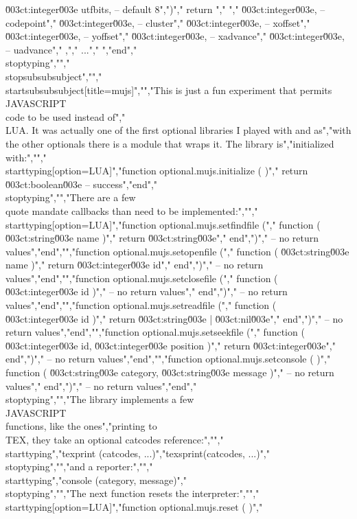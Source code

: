 \u003ct:integer\u003e  utfbits, -- default 8",")","    return {","        {","            \u003ct:integer\u003e, -- codepoint","            \u003ct:integer\u003e, -- cluster","            \u003ct:integer\u003e, -- xoffset","            \u003ct:integer\u003e, -- yoffset","            \u003ct:integer\u003e, -- xadvance","            \u003ct:integer\u003e, -- uadvance","        },","        ...","    }","end","\\stoptyping","","\\stopsubsubsubject","","\\startsubsubsubject[title=mujs]","","This is just a fun experiment that permits \\JAVASCRIPT\\ code to be used instead of","\\LUA. It was actually one of the first optional libraries I played with and as","with the other optionals there is a module that wraps it. The library is","initialized with:","","\\starttyping[option=LUA]","function optional.mujs.initialize ( )","    return \u003ct:boolean\u003e -- success","end","\\stoptyping","","There are a few \\quote {mandate} callbacks than need to be implemented:","","\\starttyping[option=LUA]","function optional.mujs.setfindfile (","    function ( \u003ct:string\u003e name )","        return \u003ct:string\u003e","    end",")","    -- no return values","end","","function optional.mujs.setopenfile  (","    function ( \u003ct:string\u003e name )","        return \u003ct:integer\u003e id","    end",")","    -- no return values","end","","function optional.mujs.setclosefile (","    function ( \u003ct:integer\u003e id )","        -- no return values","    end",")","    -- no return values","end","","function optional.mujs.setreadfile (","    function ( \u003ct:integer\u003e id )","        return \u003ct:string\u003e | \u003ct:nil\u003e","    end",")","    -- no return values","end","","function optional.mujs.setseekfile (","    function ( \u003ct:integer\u003e id, \u003ct:integer\u003e position )","        return \u003ct:integer\u003e","    end",")","    -- no return values","end","","function optional.mujs.setconsole ( )","    function ( \u003ct:string\u003e category, \u003ct:string\u003e message )","        -- no return values","    end",")","    -- no return values","end","\\stoptyping","","The library implements a few \\JAVASCRIPT\\ functions, like the ones","printing to \\TEX, they take an optional catcodes reference:","","\\starttyping","texprint (catcodes, ...)","texsprint(catcodes, ...)","\\stoptyping","","and a reporter:","","\\starttyping","console  (category, message)","\\stoptyping","","The next function resets the interpreter:","","\\starttyping[option=LUA]","function optional.mujs.reset ( )","    